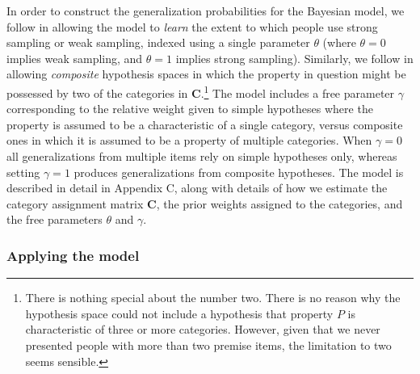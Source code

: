 \documentclass[doc,floatsintext]{apa6}
\begin{document}
In order to construct the generalization probabilities for the Bayesian model, we follow  in allowing the model to {\it learn} the extent to which people use strong sampling or weak sampling, indexed using a single parameter $\theta$ (where $\theta=0$ implies weak sampling, and $\theta = 1$ implies strong sampling). Similarly, we follow  in allowing {\it composite} hypothesis spaces in which the property in question might be possessed by two of the categories in $\mathbf{C}$.\footnote{There is nothing special about the number two. There is no reason why the hypothesis space could not include a hypothesis that property $P$ is characteristic of three or more categories. However, given that we never presented people with more than two premise items, the limitation to two seems sensible.} The model includes a free parameter $\gamma$ corresponding to the relative weight given to simple hypotheses where the property is assumed to be a characteristic of a single category, versus composite ones in which it is assumed to be a property of multiple categories. When $\gamma = 0$ all generalizations from multiple items rely on simple hypotheses only, whereas setting $\gamma = 1$ produces generalizations from composite hypotheses. The model is described in detail in Appendix C, along with details of how we estimate the category assignment matrix $\mathbf{C}$, the prior weights assigned to the categories, and the free parameters $\theta$ and $\gamma$.

\bigskip
\subsubsection*{Applying the model}
\end{document}
